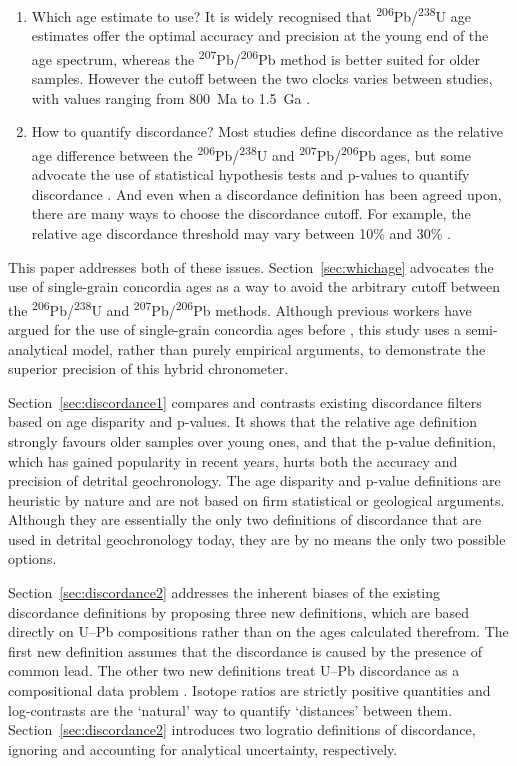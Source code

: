 \documentclass[gchron, manuscript]{copernicus}
\begin{document}
\begin{enumerate}
\item Which age estimate to use? It is widely recognised that
  \textsuperscript{206}Pb/\textsuperscript{238}U age estimates offer
  the optimal accuracy and precision at the young end of the age
  spectrum, whereas the
  \textsuperscript{207}Pb/\textsuperscript{206}Pb method is better
  suited for older samples. However the cutoff between the two clocks
  varies between studies, with values ranging from 800~Ma to 1.5~Ga
  \citep{gehrels2011,spencer2016}.
\item How to quantify discordance?  Most studies define discordance as
  the relative age difference between the
  \textsuperscript{206}Pb/\textsuperscript{238}U and
  \textsuperscript{207}Pb/\textsuperscript{206}Pb ages, but some
  advocate the use of statistical hypothesis tests and p-values to
  quantify discordance \citep{spencer2016}. And even when a
  discordance definition has been agreed upon, there are many ways to
  choose the discordance cutoff. For example, the relative age
  discordance threshold may vary between 10\% and 30\%
  \citep{gehrels2011}.
\end{enumerate}

This paper addresses both of these issues. Section~\ref{sec:whichage}
advocates the use of single-grain concordia ages \citep{ludwig1998} as
a way to avoid the arbitrary cutoff between the
\textsuperscript{206}Pb/\textsuperscript{238}U and
\textsuperscript{207}Pb/\textsuperscript{206}Pb methods. Although
previous workers have argued for the use of single-grain concordia
ages before \citep[see][for a recent example]{zimmermann2018}, this
study uses a semi-analytical model, rather than purely empirical
arguments, to demonstrate the superior precision of this hybrid
chronometer.

Section~\ref{sec:discordance1} compares and contrasts existing
discordance filters based on age disparity and p-values. It shows that
the relative age definition strongly favours older samples over young
ones, and that the p-value definition, which has gained popularity in
recent years, hurts both the accuracy and precision of detrital
geochronology. The age disparity and p-value definitions are heuristic
by nature and are not based on firm statistical or geological
arguments.  Although they are essentially the only two definitions of
discordance that are used in detrital geochronology today, they are by
no means the only two possible options.

Section~\ref{sec:discordance2} addresses the inherent biases of the
existing discordance definitions by proposing three new definitions,
which are based directly on U--Pb compositions rather than on the ages
calculated therefrom. The first new definition assumes that the
discordance is caused by the presence of common lead. The other two
new definitions treat U--Pb discordance as a compositional data
problem \citep[\textit{sensu}][]{aitchison1986}.  Isotope ratios are
strictly positive quantities and log-contrasts are the `natural' way
to quantify `distances' between them.  Section~\ref{sec:discordance2}
introduces two logratio definitions of discordance, ignoring and
accounting for analytical uncertainty, respectively.
\end{document}
